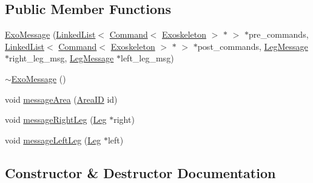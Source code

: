 \subsection*{Public Member Functions}
\begin{DoxyCompactItemize}
\item 
\hyperlink{classExoMessage_a0ce38c72897da367a035daf85574b78b}{Exo\+Message} (\hyperlink{classLinkedList}{Linked\+List}$<$ \hyperlink{classCommand}{Command}$<$ \hyperlink{classExoskeleton}{Exoskeleton} $>$ $\ast$ $>$ $\ast$pre\+\_\+commands, \hyperlink{classLinkedList}{Linked\+List}$<$ \hyperlink{classCommand}{Command}$<$ \hyperlink{classExoskeleton}{Exoskeleton} $>$ $\ast$ $>$ $\ast$post\+\_\+commands, \hyperlink{classLegMessage}{Leg\+Message} $\ast$right\+\_\+leg\+\_\+msg, \hyperlink{classLegMessage}{Leg\+Message} $\ast$left\+\_\+leg\+\_\+msg)
\item 
\hyperlink{classExoMessage_a79fc89994766ad128dd7857eacaabfea}{$\sim$\+Exo\+Message} ()
\item 
void \hyperlink{classExoMessage_a9bd51f224fcb2cb3749d6eda6df53299}{message\+Area} (\hyperlink{JointSelect_8hpp_a0b0b6279ef5d4a446f8f07404dc868d3}{Area\+ID} id)
\item 
void \hyperlink{classExoMessage_ab2bbb8222325944e6bae4ca75d00175a}{message\+Right\+Leg} (\hyperlink{classLeg}{Leg} $\ast$right)
\item 
void \hyperlink{classExoMessage_ac1555c53ca0d1c3b953cc343b7ca47d4}{message\+Left\+Leg} (\hyperlink{classLeg}{Leg} $\ast$left)
\end{DoxyCompactItemize}


\subsection{Constructor \& Destructor Documentation}

